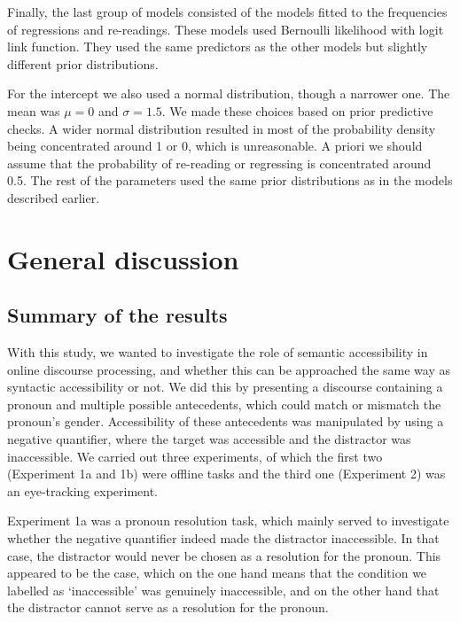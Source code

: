 \documentclass[11pt]{article} %
\begin{document}
Finally, the last group of models consisted of the models fitted to the
frequencies of regressions and re-readings. These models used Bernoulli
likelihood with logit link function. They used the same predictors as
the other models but slightly different prior distributions.

For the intercept we also used a normal distribution, though a narrower
one. The mean was \(\mu = 0\) and \(\sigma = 1.5\). We made these
choices based on prior predictive checks. A wider normal distribution
resulted in most of the probability density being concentrated around 1
or 0, which is unreasonable. A priori we should assume that the
probability of re-reading or regressing is concentrated around 0.5. The
rest of the parameters used the same prior distributions as in the
models described earlier.

\begin{comment}
ffdur
gdur
tgdur
rpdur
totfixdur
rr
rrdur
\end{comment}


% 



\section{General discussion}
\subsection{Summary of the results}
With this study, we wanted to investigate the role of semantic accessibility in online discourse processing, and whether this can be approached the same way as syntactic accessibility or not. We did this by presenting a discourse containing a pronoun and multiple possible antecedents, which could match or mismatch the pronoun's gender. Accessibility of these antecedents was manipulated by using a negative quantifier, where the target was accessible and the distractor was inaccessible. We carried out three experiments, of which the first two (Experiment 1a and 1b) were offline tasks and the third one (Experiment 2) was an eye-tracking experiment. 

Experiment 1a was a pronoun resolution task, which mainly served to investigate whether the negative quantifier indeed made the distractor inaccessible. In that case, the distractor would never be chosen as a resolution for the pronoun. This appeared to be the case, which on the one hand means that the condition we labelled as `inaccessible' was genuinely inaccessible, and on the other hand that the distractor cannot serve as a resolution for the pronoun.
\end{document}
